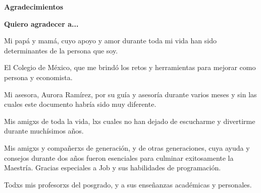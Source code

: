 \begin{titlepage}

\vspace*{\fill}
	\begin{Huge}
		\textbf{Agradecimientos} \\[0.3in]
	\end{Huge}

\normalsize{\textbf{Quiero agradecer a...}}

Mi papá y mamá, cuyo apoyo y amor durante toda mi vida han sido determinantes de la persona que soy.

El Colegio de México, que me brindó los retos y herramientas para mejorar como persona y economista.

Mi asesora, Aurora Ramírez, por su guía y asesoría durante varios meses y sin las cuales este documento habría sido muy diferente.

Mis amigxs de toda la vida, lxs cuales no han dejado de escucharme y divertirme durante muchísimos años.

Mis amigxs y compañerxs de generación, y de otras generaciones, cuya ayuda y consejos durante dos años fueron esenciales para culminar exitosamente la Maestría. Gracias especiales a Job y sus habilidades de programación.

Todxs mis profesorxs del posgrado, y a sus enseñanzas académicas y personales.

\vspace*{\fill}
	
\end{titlepage}

\begin{titlepage}
\
\end{titlepage}


